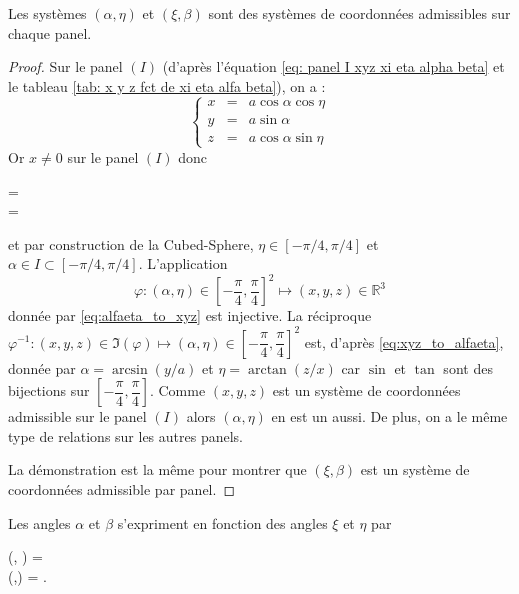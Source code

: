 \begin{theoreme}
Les systèmes $(\alpha, \eta)$ et $(\xi, \beta)$ sont des systèmes de coordonnées admissibles sur chaque panel.
\end{theoreme} 

\begin{proof}
Sur le panel $(I)$ (d'après l'équation \eqref{eq: panel I xyz xi eta alpha beta} et le tableau \ref{tab: x y z fct de xi eta alfa beta}), on a :
\begin{equation}
\left\lbrace
\begin{array}{rcl}
x & = & a \cos \alpha \cos \eta \\
y & = & a \sin \alpha \\
z & = & a \cos \alpha \sin \eta
\end{array}
\right.
\label{eq:alfaeta_to_xyz}
\end{equation}
Or $x \neq 0$ sur le panel $(I)$ donc
\begin{eqsys}
\tan \eta =  \\
\sin \alpha = 
\label{eq:xyz_to_alfaeta}
\end{eqsys}
et par construction de la Cubed-Sphere, $\eta \in [- \pi/4, \pi/4]$ et $\alpha \in I \subset[- \pi/4, \pi/4]$. L'application
\begin{equation}
\varphi : (\alpha, \eta) \in \left[ - \dfrac{\pi}{4}, \dfrac{\pi}{4} \right]^2 \mapsto (x,y,z) \in \mathbb{R}^3
\end{equation}
donnée par \eqref{eq:alfaeta_to_xyz} est injective. La réciproque $\varphi^{-1} : (x,y,z) \in \Im(\varphi) \mapsto (\alpha, \eta) \in \left[ - \dfrac{\pi}{4}, \dfrac{\pi}{4} \right]^2$ est, d'après \eqref{eq:xyz_to_alfaeta}, donnée par $\alpha = \arcsin (y/a)$ et $\eta = \arctan(z/x)$ car $\sin$ et $\tan$ sont des bijections sur $\left[ - \dfrac{\pi}{4}, \dfrac{\pi}{4} \right]$. Comme $(x,y,z)$ est un système de coordonnées admissible sur le panel $(I)$ alors $(\alpha, \eta)$ en est un aussi. De plus, on a le même type de relations sur les autres panels.

La démonstration est la même pour montrer que $(\xi, \beta)$ est un système de coordonnées admissible par panel.
\end{proof}


\begin{proposition}
Les angles $\alpha$ et $\beta$ s'expriment en fonction des angles $\xi$ et $\eta$ par
\begin{eqsys}
\alpha(\xi, \eta) = \arctan {} \\
\beta(\xi,\eta) = \arctan {} .
\label{eq: alpha et beta fct de xi et eta}
\end{eqsys}
\label{prop:alfa_beta_xi_eta}
\end{proposition}

